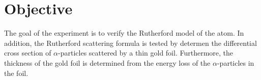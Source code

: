 \section{Objective}
\label{sec:Objective}
The goal of the experiment is to verify the Rutherford model of the atom.
In addition, the Rutherford scattering formula is tested by determen the differential cross section of $\alpha$-particles scattered by a thin gold foil.
Furthermore, the thickness of the gold foil is determined from the energy loss of the $\alpha$-particles in the foil.